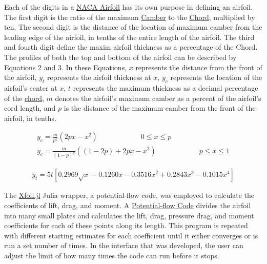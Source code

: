 \documentclass{article}
\begin{document}
Each of the digits in a \hyperlink{NACA}{NACA Airfoil} has its own purpose in defining an airfoil. The first digit is the ratio of the maximum \hyperlink{Camber}{Camber} to the \hyperlink{c}{Chord}, multiplied by ten. The second digit is the distance of the location of maximum camber from the leading edge of the airfoil, in tenths of the entire length of the airfoil. The third and fourth digit define the maxim airfoil thickness as a percentage of the Chord. The profiles of both the top and bottom of the airfoil can be described by Equations 2 and 3. In these Equations, $x$ represents the distance from the front of the airfoil, $y_{t}$ represents the airfoil thickness at $x$, $y_{c}$ represents the location of the airfoil's center at $x$, $t$ represents the maximum thickness as a decimal percentage of the \hyperlink{c}{chord}, $m$ denotes the airfoil's maximum camber as a percent of the airfoil's cord length, and $p$ is the distance of the maximum camber from the front of the airfoil, in tenths. \newline

\begin{equation} \label{eq:2}
\begin{aligned}
	y_{c} = \frac{m}{p^2} (2 p x - x^2) \qquad \qquad \qquad 0 \leq x \leq p \\
	y_{c} = \frac{m}{(1 - p)^2} ((1 - 2 p) + 2 p x - x^2) \qquad \qquad \qquad p \leq x \leq 1
\end{aligned}
\end{equation}

\begin{equation} \label{eq:3}
\begin{aligned}
	y_{t} = 5 t [ 0.2969 \sqrt{x} - 0.1260 x - 0.3516 x^{2} + 0.2843 x^{3} - 0.1015 x^{4}]
\end{aligned}
\end{equation}

The \href{https://docs.juliahub.com/Xfoil/Mlbda/0.4.0/}{Xfoil.jl} Julia wrapper, a potential-flow code, was employed to calculate the coefficients of lift, drag, and moment. A \hyperlink{PFC}{Potential-flow Code} divides the airfoil into many small plates and calculates the lift, drag, pressure drag, and moment coefficients for each of these points along its length. This program is repeated with different starting estimates for each coefficient until it either converges or is run a set number of times. In the interface that was developed, the user can adjust the limit of how many times the code can run before it stops.\newline
\end{document}
